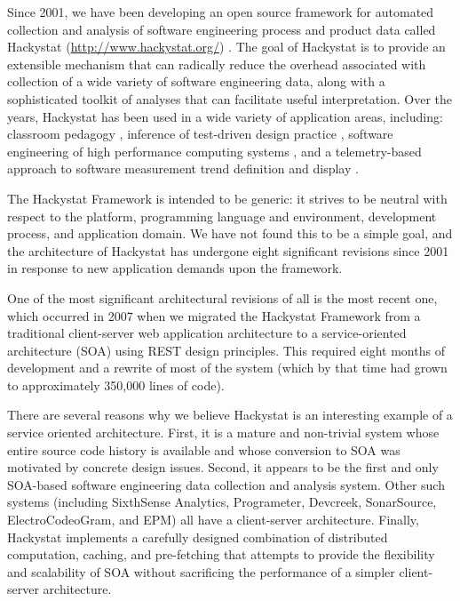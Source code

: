 \documentclass[conference,compsoc,peerreview]{IEEEtran}
\begin{document}
Since 2001, we have been developing an open source framework for automated
collection and analysis of software engineering process and product data
called Hackystat (\url{http://www.hackystat.org/})
\cite{csdl2-06-06,csdl2-02-07}.  The goal of Hackystat is to provide an
extensible mechanism that can radically reduce the overhead associated with
collection of a wide variety of software engineering data, along with a
sophisticated toolkit of analyses that can facilitate useful
interpretation.  Over the years, Hackystat has been used in a wide variety
of application areas, including: classroom pedagogy \cite{csdl2-03-12},
inference of test-driven design practice \cite{csdl2-06-13}, software
engineering of high performance computing systems \cite{csdl2-06-08}, and a
telemetry-based approach to software measurement trend definition and
display \cite{csdl2-04-11}.

The Hackystat Framework is intended to be generic: it strives to be neutral
with respect to the platform, programming language and environment,
development process, and application domain.  We have not found this to be
a simple goal, and the architecture of Hackystat has undergone eight
significant revisions since 2001 in response to new application demands
upon the framework.

One of the most significant architectural revisions of all is the most
recent one, which occurred in 2007 when we migrated the Hackystat Framework
from a traditional client-server web application architecture to a
service-oriented architecture (SOA) using REST design principles.  This
required eight months of development and a rewrite of most of the system
(which by that time had grown to approximately 350,000 lines of code).

There are several reasons why we believe Hackystat is an interesting
example of a service oriented architecture.  First, it is a mature and
non-trivial system whose entire source code history is available and whose
conversion to SOA was motivated by concrete design issues.  Second, it
appears to be the first and only SOA-based software engineering data
collection and analysis system.  Other such systems (including SixthSense
Analytics, Programeter, Devcreek, SonarSource, ElectroCodeoGram, and EPM)
all have a client-server architecture.  Finally, Hackystat implements a
carefully designed combination of distributed computation, caching, and
pre-fetching that attempts to provide the flexibility and scalability of
SOA without sacrificing the performance of a simpler client-server
architecture.
\end{document}

